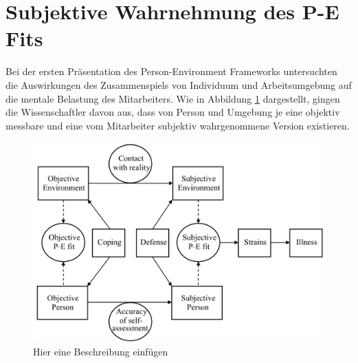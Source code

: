 \section{Subjektive Wahrnehmung des P-E Fits}
\label{ch:personEnvironmentFit:subjektivObjektiv}
Bei der ersten Präsentation des Person-Environment Frameworks untersuchten \textcite{copingAndAdaption:1974} die Auswirkungen des Zusammenspiels von Individuum und Arbeitsumgebung auf die mentale Belastung des Mitarbeiters. Wie in Abbildung \ref{fig:personEnvironmentFit:subjektivObjektiv:abb1} dargestellt, gingen die Wissenschaftler davon aus, dass von Person und Umgebung je eine objektiv messbare und eine vom Mitarbeiter subjektiv wahrgenommene Version existieren. \\
\begin{figure}[h]
	\centering
	\includegraphics[width=1\textwidth]{gfx/subjektivObjektivPEFit.png}
	\caption{Hier eine Beschreibung einfügen \cite[S. 22]{edwards:2008}}
	\label{fig:personEnvironmentFit:subjektivObjektiv:abb1}
\end{figure}
\\
